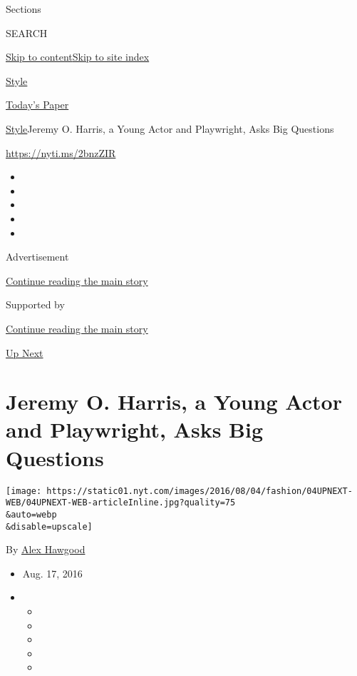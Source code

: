 Sections

SEARCH

\protect\hyperlink{site-content}{Skip to
content}\protect\hyperlink{site-index}{Skip to site index}

\href{https://www.nytimes.com/section/style}{Style}

\href{https://myaccount.nytimes.com/auth/login?response_type=cookie\&client_id=vi}{}

\href{https://www.nytimes.com/section/todayspaper}{Today's Paper}

\href{/section/style}{Style}\textbar{}Jeremy O. Harris, a Young Actor
and Playwright, Asks Big Questions

\href{https://nyti.ms/2bnzZIR}{https://nyti.ms/2bnzZIR}

\begin{itemize}
\item
\item
\item
\item
\item
\end{itemize}

Advertisement

\protect\hyperlink{after-top}{Continue reading the main story}

Supported by

\protect\hyperlink{after-sponsor}{Continue reading the main story}

\href{/column/up-next}{Up Next}

\hypertarget{jeremy-o-harris-a-young-actor-and-playwright-asks-big-questions}{%
\section{Jeremy O. Harris, a Young Actor and Playwright, Asks Big
Questions}\label{jeremy-o-harris-a-young-actor-and-playwright-asks-big-questions}}

\texttt{[image: https://static01.nyt.com/images/2016/08/04/fashion/04UPNEXT-WEB/04UPNEXT-WEB-articleInline.jpg?quality=75\\\&auto=webp\\\&disable=upscale]}

By \href{https://www.nytimes.com/by/alex-hawgood}{Alex Hawgood}

\begin{itemize}
\item
  Aug. 17, 2016
\item
  \begin{itemize}
  \item
  \item
  \item
  \item
  \item
  \end{itemize}
\end{itemize}

